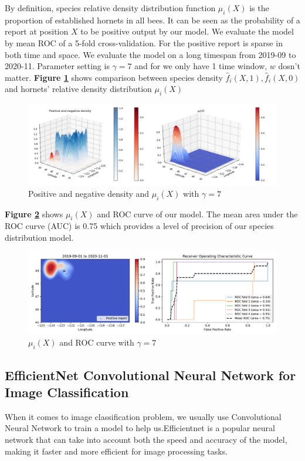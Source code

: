 \documentclass[12pt]{article}
\begin{document}
By definition, species relative density distribution function $\mu_i(X)$ is the proportion of established hornets in all bees. It can be seen as the probability of a report at position $X$ to be positive output by our model.
We evaluate the model by mean ROC of a 5-fold cross-validation. For the positive report is sparse in both time and space. We evaluate the model on a long timespan from 2019-09 to 2020-11. Parameter setting is $\gamma=7$ and for we only have 1 time window, $w$ dosn't matter.
\textbf{Figure \ref{species_3d_mu}} shows comparison between species density $\hat{f}_i(X, 1), \hat{f}_i(X, 0) $ and hornets' relative density distribution $\mu_i(X)$

\begin{figure}[H]%
	\small
	\centering
	\includegraphics[width=17cm]{./pictures/species_3d_mu.png}
	\caption{Positive and negative density and $\mu_i(X)$ with $\gamma=7$}\label{species_3d_mu}
\end{figure}

\textbf{Figure \ref{species_total_mu_roc}} shows $\mu_i(X)$ and ROC curve of our model. The mean area under the ROC curve (AUC) is 0.75 which provides a level of precision of our species distribution model.

\begin{figure}[H]%
	\small
	\centering
	\includegraphics[width=17cm]{./pictures/species_total_mu_roc.pdf}
	\caption{$\mu_i(X)$ and ROC curve with $\gamma=7$}\label{species_total_mu_roc}
\end{figure}


\subsection{EfficientNet Convolutional Neural Network for Image Classification}
When it comes to image classification problem, we usually use Convolutional Neural Network to train a model to help us.Efficientnet is a popular neural network that can take into account both the speed and accuracy of the model, making it faster and more efficient for image processing tasks.
\end{document}
